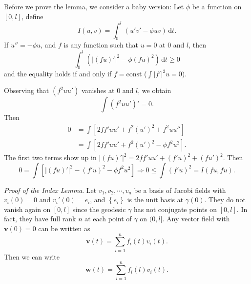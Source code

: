 \begin{remark}
  Before we prove the lemma, we consider a baby version: Let $\phi$ be a function on $[0,l]$, define 
  \[
    I(u,v)=\int_0^{l}\left( u'v'-\phi uv \right)\,\mathrm{d}t.
  \] 
  If $u''=-\phi u$, and $f$ is any function such that $u=0$ at $0$ and $l$, then 
  \[
    \int_0^{l}\left( \left| (fu)' \right| ^2-\phi(fu)^2 \right)\,\mathrm{d}t\ge 0
  \] 
  and the equality holds if and only if $f=\text{const}$ ($\int|f'|^2u=0$).

  Observing that $(f^2uu')$ vanishes at $0$ and $l$, we obtain
  \[
    \int (f^2uu')'=0.
  \] 
  Then 
  \begin{align*}
    0&= \int \left[ 2ff'uu'+f^2(u')^2+f^2uu'' \right] \\
     &=\int \left[ 2ff'uu'+f^2(u')^2-\phi f^2 u^2 \right]
  .\end{align*}
  The first two terms show up in $\left| (fu)' \right| ^2=2ff'uu'+(f'u)^2+(fu')^2$. Then 
  \[
    0=\int \left[ |(fu)'|^2-(f'u)^2-\phi f^2 u^2 \right]\Rightarrow 0\le \int (f'u)^2=I(fu,fu) .
  \] 
\end{remark}
\textit{Proof of the Index Lemma}. Let $v_1,v_2,\cdots ,v_n$ be a basis of Jacobi fields with $v_i(0)=0$ and $v_i'(0)=e_i$, and $\left\{e_i\right\} $ is the unit basis at $\gamma(0)$.
They do not vanish again on $[0,l]$ since the geodesic $\gamma$ has not conjugate points on $[0,l]$. In fact, they have full rank $n$ at each point of $\gamma$ on $(0,l]$.
Any vector field with $\mathbf{v}(0)=0$ can be written as 
\[
  \mathbf{v}(t)=\sum_{i=1}^{n} f_i(t)v_i(t).
\] 
Then we can write 
\[
  \mathbf{w}(t)=\sum_{i=1}^{n} f_i(l)v_i(t).
\] 

